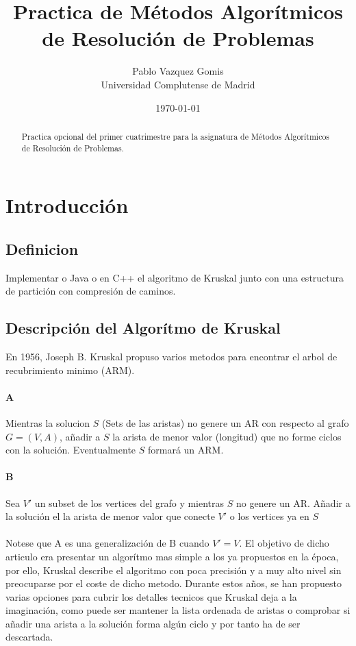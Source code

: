 \documentclass{article}
\title{Practica de Métodos Algorítmicos de Resolución de Problemas}
\author{Pablo Vazquez Gomis  \\
	Universidad Complutense de Madrid \\
	}
\date{\today}
\begin{document}
\maketitle


\begin{abstract}
Practica opcional del primer cuatrimestre para la asignatura de Métodos Algorítmicos de Resolución de Problemas.
\end{abstract}

\section{Introducción}
\subsection{Definicion}
Implementar o Java o en C++ el algoritmo de Kruskal junto con una estructura de partición con compresión de caminos.
\subsection{Descripción del Algorítmo de Kruskal} \label{sec:algo}
En 1956, Joseph B. Kruskal\cite{kru} propuso varios metodos para encontrar el arbol de recubrimiento minimo (ARM).
\paragraph{A} Mientras la solucion $S$ (Sets de las aristas) no genere un AR con respecto al grafo $G=(V, A)$, añadir a $S$ la arista de menor valor (longitud) que no forme ciclos con la solución. Eventualmente $S$ formará un ARM.
\paragraph{B} Sea $V'$ un subset de los vertices del grafo y mientras $S$ no genere un AR. Añadir a la solución el la arista de menor valor que conecte $V'$ o los vertices ya en $S$
\paragraph{} Notese que A es una generalización de B cuando $V'=V$.
El objetivo de dicho articulo era presentar un algorítmo mas simple a los ya propuestos en la época, por ello, Kruskal describe el algoritmo con poca precisión y a muy alto nivel sin preocuparse por el coste de dicho metodo.
Durante estos años, se han propuesto varias opciones para cubrir los detalles tecnicos que Kruskal deja a la imaginación, como puede ser mantener la lista ordenada de aristas o comprobar si añadir una arista a la solución forma algún ciclo y por tanto ha de ser descartada.
\end{document}
